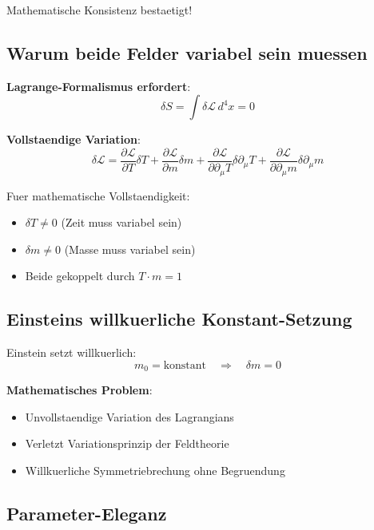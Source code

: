 \documentclass[12pt,a4paper]{article}
\theoremstyle{definition}
\theoremstyle{remark}
\begin{document}
	Mathematische Konsistenz bestaetigt!
	
	\subsection{Warum beide Felder variabel sein muessen}
	
	\textbf{Lagrange-Formalismus erfordert}:
	\begin{equation}
		\delta S = \int \delta \mathcal{L} \, d^4x = 0
	\end{equation}
	
	\textbf{Vollstaendige Variation}:
	\begin{equation}
		\delta \mathcal{L} = \frac{\partial \mathcal{L}}{\partial T}\delta T + \frac{\partial \mathcal{L}}{\partial m}\delta m + \frac{\partial \mathcal{L}}{\partial \partial_\mu T}\delta \partial_\mu T + \frac{\partial \mathcal{L}}{\partial \partial_\mu m}\delta \partial_\mu m
	\end{equation}
	
	Fuer mathematische Vollstaendigkeit:
	\begin{itemize}
		\item $\delta T \neq 0$ (Zeit muss variabel sein)
		\item $\delta m \neq 0$ (Masse muss variabel sein)
		\item Beide gekoppelt durch $T \cdot m = 1$
	\end{itemize}
	
	\subsection{Einsteins willkuerliche Konstant-Setzung}
	
	Einstein setzt willkuerlich:
	\begin{equation}
		m_0 = \text{konstant} \quad \Rightarrow \quad \delta m = 0
	\end{equation}
	
	\textbf{Mathematisches Problem}:
	\begin{itemize}
		\item Unvollstaendige Variation des Lagrangians
		\item Verletzt Variationsprinzip der Feldtheorie
		\item Willkuerliche Symmetriebrechung ohne Begruendung
	\end{itemize}
	
	\subsection{Parameter-Eleganz}
	
\end{document}

